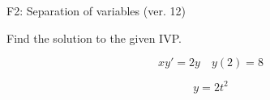 \begin{exercise}
  \begin{exerciseTitle}F2: Separation of variables (ver. 12)\end{exerciseTitle}
  \begin{exerciseStatement}
    
Find the solution to the given IVP.

    
\[xy'= 2 y \hspace{1em} y( 2 ) = 8\]

  \end{exerciseStatement}
  \begin{exerciseAnswer}
    
\[y= 2 t^ 2\]

  \end{exerciseAnswer}
\end{exercise}
